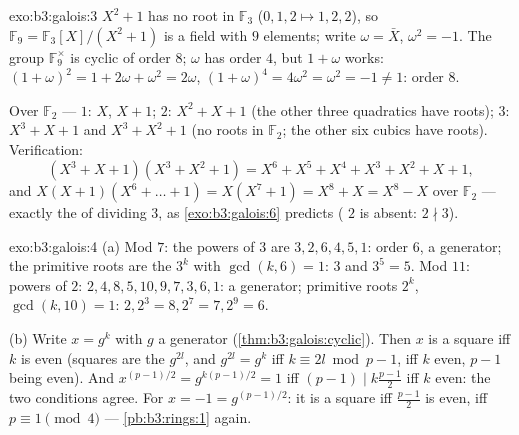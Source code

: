 \begin{solution}{exo:b3:galois:3}
$X^2 + 1$ has no root in $\mathbb F_3$ ($0, 1, 2 \mapsto 1, 2,
2$), so $\mathbb F_9 = \mathbb F_3[X]/(X^2+1)$ is a field with
$9$ elements; write $\omega = \bar X$, $\omega^2 = -1$. The
group $\mathbb F_9^\times$ is cyclic of order $8$; $\omega$ has
order $4$, but $1 + \omega$ works: $(1+\omega)^2 = 1 + 2\omega +
\omega^2 = 2\omega$, $(1+\omega)^4 = 4\omega^2 = \omega^2 = -1
\ne 1$: order $8$.

Over $\mathbb F_2$ ---  $1$: $X$, $X + 1$;  $2$:
$X^2 + X + 1$ (the other three quadratics have roots); 
$3$: $X^3 + X + 1$ and $X^3 + X^2 + 1$ (no roots in $\mathbb
F_2$; the other six cubics have roots). Verification:
\[
(X^3{+}X{+}1)(X^3{+}X^2{+}1) = X^6 + X^5 + X^4 + X^3 + X^2 + X
+ 1,
\]
and $X(X{+}1)(X^6 + \dots + 1) = X(X^7 + 1) = X^8 + X = X^8 -
X$ over $\mathbb F_2$ --- exactly the  of 
dividing $3$, as \cref{exo:b3:galois:6} predicts ( $2$ is
absent: $2 \nmid 3$).
\end{solution}

\begin{solution}{exo:b3:galois:4}
(a) Mod $7$: the powers of $3$ are $3, 2, 6, 4, 5, 1$: order
$6$, a generator; the primitive roots are the $3^k$ with
$\gcd(k, 6) = 1$: $3$ and $3^5 = 5$. Mod $11$: powers of $2$:
$2, 4, 8, 5, 10, 9, 7, 3, 6, 1$: a generator; primitive roots
$2^k$, $\gcd(k, 10) = 1$: $2, 2^3 = 8, 2^7 = 7, 2^9 = 6$.

(b) Write $x = g^k$ with $g$ a generator
(\cref{thm:b3:galois:cyclic}). Then $x$ is a square iff $k$ is
even (squares are the $g^{2l}$, and $g^{2l} = g^{k}$ iff $k
\equiv 2l \bmod p-1$,  iff $k$ even, $p - 1$ being
even). And $x^{(p-1)/2} = g^{k(p-1)/2} = 1$ iff $(p-1) \mid
k\frac{p-1}2$ iff $k$ even: the two conditions agree. For $x =
-1 = g^{(p-1)/2}$: it is a square iff $\frac{p-1}2$ is even, iff
$p \equiv 1 \pmod 4$ --- \cref{pb:b3:rings:1} again.
\end{solution}


